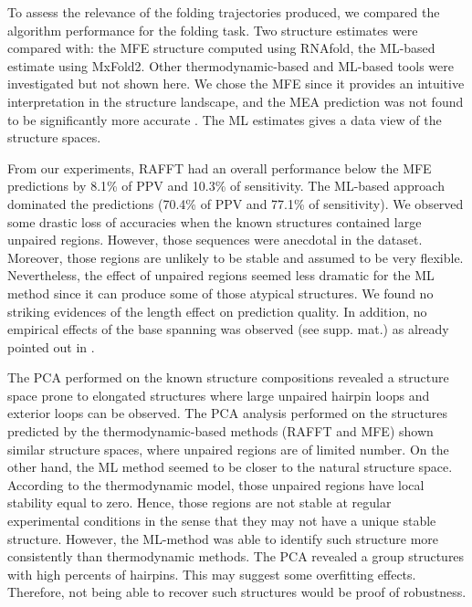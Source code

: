 \documentclass[a4paper,12pt]{article}
\begin{document}
To assess the relevance of the folding trajectories produced, we compared the
algorithm performance for the folding task. Two structure estimates were
compared with: the MFE structure computed using RNAfold, the ML-based estimate
using MxFold2. Other thermodynamic-based and ML-based tools were investigated
but not shown here. We chose the MFE since it provides an intuitive
interpretation in the structure landscape, and the MEA prediction was not found
to be significantly more accurate \cite{mathews19_how_to_bench_rna_secon}. The ML
estimates gives a data view of the structure spaces.

From our experiments, RAFFT had an overall performance below the MFE predictions
by 8.1\% of PPV and 10.3\% of sensitivity. The ML-based approach dominated the
predictions (70.4\% of PPV and 77.1\% of sensitivity). We observed some drastic
loss of accuracies when the known structures contained large unpaired regions.
However, those sequences were anecdotal in the dataset. Moreover, those regions
are unlikely to be stable and assumed to be very flexible. Nevertheless, the
effect of unpaired regions seemed less dramatic for the ML method since it can
produce some of those atypical structures. We found no striking evidences of the
length effect on prediction quality. In addition, no empirical effects of the
base spanning was observed (see supp. mat.) as already pointed out in
\cite{amman13_troub_long_range_base_pairs_rna_foldin}.

The PCA performed on the known structure compositions revealed a structure space
prone to elongated structures where large unpaired hairpin loops and exterior
loops can be observed. The PCA analysis performed on the structures predicted by
the thermodynamic-based methods (RAFFT and MFE) shown similar structure spaces,
where unpaired regions are of limited number. On the other hand, the ML method
seemed to be closer to the natural structure space. According to the
thermodynamic model, those unpaired regions have local stability equal to zero.
Hence, those regions are not stable at regular experimental conditions in the
sense that they may not have a unique stable structure. However, the ML-method
was able to identify such structure more consistently than thermodynamic
methods. The PCA revealed a group structures with high percents of hairpins.
This may suggest some overfitting effects. Therefore, not being able to recover
such structures would be proof of robustness.
\end{document}

